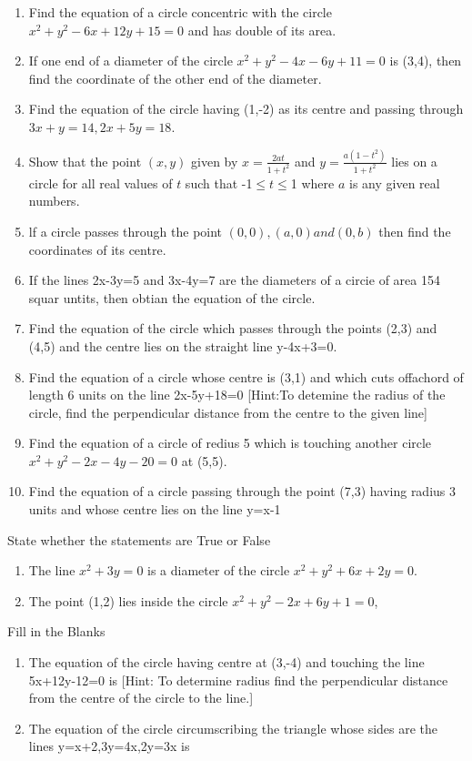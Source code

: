\begin{enumerate}[label=\thesection.\arabic*,ref=\thesection.\theenumi,resume*]
 \item Find the equation of a circle concentric with the circle $x^2+y^2-6x+12y+15=0$ and has double of its area.
 \item If one end of a diameter of the circle $x^2+y^2-4x-6y+11 =0$ is (3,4), then find the coordinate of the other end of the diameter.
 \item Find the equation of the circle having (1,-2) as its centre  and passing through $3x+y=14, 2x+5y=18$.
 \item Show that the point $(x,y)$ given by $x=\frac{2at}{1+t^2}$ and $y=\frac{a(1-t^2)}{1+t^2}$ lies on a circle for all real values of $t$ such that -1$\le t \le $1 where $a$ is any given real numbers. 
 \item lf a circle passes through the point $(0,0),(a,0) and (0,b)$ then find the coordinates of its centre.
\item If the lines 2x-3y=5 and 3x-4y=7 are the diameters of a circie of area 154 squar untits, then obtian the equation of the circle.
\item Find the equation of the circle which passes through the points (2,3) and (4,5) and the centre lies on the straight line y-4x+3=0.
\item Find the equation of a circle whose centre is (3,1) and which cuts offachord of length  6 units on the  line 2x-5y+18=0
[Hint:To detemine the radius of the circle, find the perpendicular distance from the centre to the given line]
\item Find the equation of a circle of redius 5 which is touching another circle $x^2+y^2-2x-4y-20=0$ at (5,5).
\item Find the equation of a circle passing through the point (7,3) having radius 3 units and whose centre lies on the line y=x-1
\end{enumerate}
State whether the statements are True or False 
\begin{enumerate}[label=\thesection.\arabic*,ref=\thesection.\theenumi,resume*]
\item The line $x^2+3y=0$ is a diameter of the circle $x^2+y^2+6x+2y=0$.
\item The point (1,2) lies inside the circle $x^2+y^2-2x+6y+1=0$,
\end{enumerate}
Fill in the Blanks
\begin{enumerate}[label=\thesection.\arabic*,ref=\thesection.\theenumi,resume*]
\item The equation of the circle having centre at (3,-4) and touching the line 5x+12y-12=0 is \makebox[1cm]{\hrulefill}                     
[Hint: To determine radius find the perpendicular distance  from the centre of the circle to the line.]
\item The equation of the circle circumscribing the triangle whose sides are the lines y=x+2,3y=4x,2y=3x is  \makebox[1cm]{\hrulefill}         
\end{enumerate}
